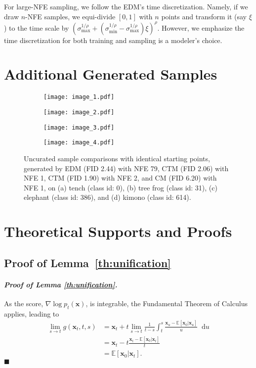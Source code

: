 \documentclass{article} \usepackage{iclr2024_coNFErence,times}
\newenvironment{myproof}[2]{\paragraph{\textit{Proof of {#1} {#2}. }}}{\hfill$\blacksquare$}
\theoremstyle{definition}
\theoremstyle{remark}
\newcommand*\diff{\mathop{}\!\mathrm{d}}
\begin{document}
For large-NFE sampling, we follow the EDM's time discretization. Namely, if we draw $n$-NFE samples, we equi-divide $[0,1]$ with $n$ points and transform it (say $\xi$) to the time scale by $(\sigma_{\text{max}}^{1/\rho}+(\sigma_{\text{min}}^{1/\rho}-\sigma_{\text{max}}^{1/\rho})\xi)^{\rho}$. However, we emphasize the time discretization for both training and sampling is a modeler's choice.

\section{Additional Generated Samples}\label{sec:generated_samples}
\begin{figure}[t]\centering
	\begin{subfigure}{0.24\linewidth}
		\centering
		\texttt{[image: image\_1.pdf]}
	\end{subfigure}
	\begin{subfigure}{0.24\linewidth}
		\centering
		\texttt{[image: image\_2.pdf]}
	\end{subfigure}	
 	\begin{subfigure}{0.24\linewidth}
		\centering
		\texttt{[image: image\_3.pdf]}
	\end{subfigure}
  	\begin{subfigure}{0.24\linewidth}
		\centering
		\texttt{[image: image\_4.pdf]}
	\end{subfigure}
	\caption{Uncurated sample comparisons with identical starting points, generated by EDM (FID 2.44) with NFE 79, CTM (FID 2.06) with NFE 1, CTM (FID 1.90) with NFE 2, and CM (FID 6.20) with NFE 1, on (a) tench (class id: 0), (b) tree frog (class id: 31), (c) elephant (class id: 386), and (d) kimono (class id: 614).}
    \label{fig:image_results}
	 \vskip -0.1in
\end{figure}
\newpage
\clearpage
\section{Theoretical Supports and Proofs}\label{sec:proof}

\subsection{Proof of Lemma~\ref{th:unification}}
\begin{myproof}{Lemma}{\ref{th:unification}}
As the score, $\nabla\log p_t(\mathbf{x})$, is integrable, the Fundamental Theorem of Calculus applies, leading to
\begin{align*}
    \lim_{s\rightarrow t}g(\mathbf{x}_{t},t,s)&=\mathbf{x}_{t}+t\lim_{s\rightarrow t}\frac{1}{t-s}\int_{t}^{s}\frac{\mathbf{x}_{u}-\mathbb{E}[\mathbf{x}_{0}\vert\mathbf{x}_{u}]}{u}\diff u
    \\&=\mathbf{x}_{t}-t\frac{\mathbf{x}_{t}-\mathbb{E}[\mathbf{x}_{0}\vert\mathbf{x}_{t}]}{t}\\
    &=\mathbb{E}[\mathbf{x}_{0}\vert\mathbf{x}_{t}].
\end{align*}
\end{myproof}
\end{document}
